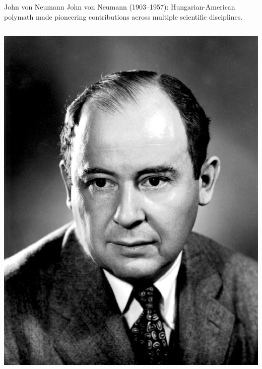 \begin{frame}{John von Neumann}
\small
John von Neumann (1903–1957): Hungarian-American polymath  made pioneering contributions across multiple scientific disciplines. 
    \begin{columns}
            \includegraphics[width=\textwidth]{lesson_4/images/von_neumann.jpg} %
            
            \scriptsize
            

\end{columns}
\end{frame}
